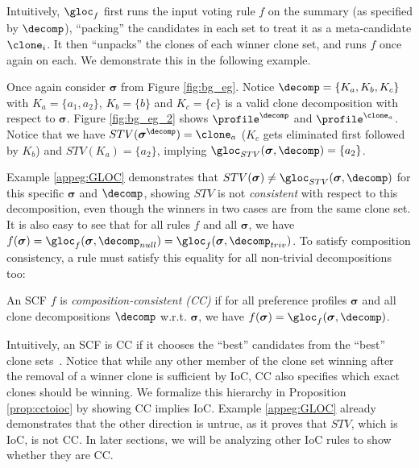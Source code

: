 Intuitively, $\gloc_f$ first runs the input voting rule $f$ on the summary (as specified by $\decomp$), ``packing'' the candidates in each set to treat it as a meta-candidate $\clone_i$. It then ``unpacks'' the clones of each winner clone set, and runs $f$ once again on each. We demonstrate this in the following example.
\begin{example}\label{appeg:GLOC}

Once again consider $\boldsymbol{\sigma}$ from Figure \ref{fig:bg_eg}. Notice $\decomp=\{K_a,K_b,K_c\}$ with $K_a=\{a_1,a_2\}$, $K_b=\{b\}$ and $K_c=\{c\}$ is a valid clone decomposition with respect to $\boldsymbol{\sigma}$. Figure \ref{fig:bg_eg_2} shows $\profile^\decomp$ and $\profile^{\clone_a}$. Notice that we have $STV(\boldsymbol{\sigma}^\decomp)=\clone_a$ ($K_c$ gets eliminated first followed by $K_b$) and $STV(K_a)=\{a_2\}$, implying $\gloc_{STV}(\boldsymbol{\sigma}, \decomp) =\{a_2\}$.

\end{example}

Example \ref{appeg:GLOC} demonstrates that $STV(\boldsymbol{\sigma}) \neq \gloc_{STV}(\boldsymbol{\sigma}, \decomp)$ for this specific $\boldsymbol{\sigma}$ and $\decomp$, showing $STV$ is not \textit{consistent} with respect to this decomposition, even though the winners in two cases are from the same clone set. It is also easy to see that for all rules $f$ and all $\boldsymbol{\sigma}$, we have $f(\boldsymbol{\sigma})=\gloc_f(\boldsymbol{\sigma}, \decomp_{null})=\gloc_f(\boldsymbol{\sigma}, \decomp_{triv})$. To satisfy composition consistency, a rule must satisfy this equality for all non-trivial decompositions too: 
  \begin{definition}\label{appdef:oioc}
      An SCF $f$ is \emph{composition-consistent (CC)} if for all preference profiles $\boldsymbol{\sigma}$ and all clone decompositions $\decomp$ w.r.t. $\boldsymbol{\sigma}$, we have $f(\boldsymbol{\sigma}) =\gloc_f(\boldsymbol{\sigma}, \decomp)$.
\end{definition}

Intuitively, an SCF is CC if it chooses the ``best'' candidates from the ``best'' clone sets~\citep{Laffond96:Composition}. Notice that while any other member of the clone set winning after the removal of a winner clone is sufficient by IoC, CC also specifies which exact clones should be winning. We formalize this hierarchy in Proposition \ref{prop:cctoioc} by showing CC implies IoC. Example \ref{appeg:GLOC} already demonstrates that the other direction is untrue, as it proves that $STV$, which is IoC, is not CC. In later sections, we will be analyzing other IoC rules to show whether they are CC.  


